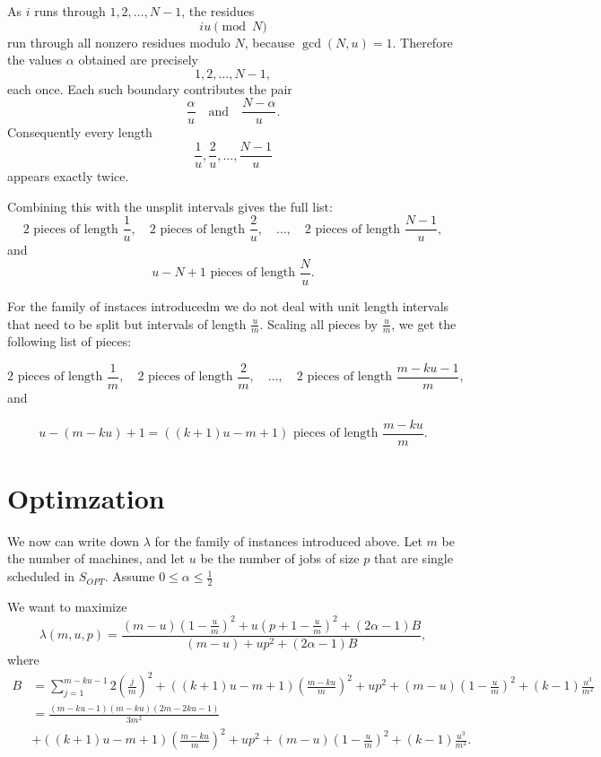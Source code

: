 \documentclass[11pt]{article}
\begin{document}
As \(i\) runs through \(1,2,\ldots,N-1\), the residues
\[
iu \pmod N
\]
run through all nonzero residues modulo \(N\), because \(\gcd(N,u)=1\). Therefore the values \(\alpha\) obtained are precisely
\[
1,2,\ldots,N-1,
\]
each once. Each such boundary contributes the pair
\[
\frac{\alpha}{u}
\quad\text{and}\quad
\frac{N-\alpha}{u}.
\]
Consequently every length
\[
\frac{1}{u},\frac{2}{u},\ldots,\frac{N-1}{u}
\]
appears exactly twice.

Combining this with the unsplit intervals gives the full list:
\[
2 \text{ pieces of length } \frac{1}{u},
\quad
2 \text{ pieces of length } \frac{2}{u},
\quad
\ldots,
\quad
2 \text{ pieces of length } \frac{N-1}{u},
\]
and
\[
u-N+1 \text{ pieces of length } \frac{N}{u}.
\]


For the family of instaces introducedm we do not deal with unit length intervals that need to be split but intervals of length $\frac{u}{m}$. 
Scaling all pieces by $\frac{u}{m}$, we get the following list of pieces:

\[
2 \text{ pieces of length } \frac{1}{m},
\quad
2 \text{ pieces of length } \frac{2}{m},
\quad
\ldots, 
\quad
2 \text{ pieces of length } \frac{m-ku-1}{m},
\]
and

\[
u-(m-ku)+1=((k+1)u-m+1) \text{ pieces of length } \frac{m-ku}{m}.
\]

\section{Optimzation}

We now can write down $\lambda$ for the family of instances introduced above. Let \(m\) be the number of machines, and let \(u\) be the number of jobs of size \(p\) that are single scheduled in \(S_{OPT}\). Assume  
$ 0 \leq \alpha \leq \frac12$


We want to maximize
\[
\lambda(m,u,p)=\frac{
(m-u)\left(1-\frac um\right)^2
 +u\left(p+1-\frac um\right)^2
 +(2\alpha-1)B
}{
(m-u)+up^2+(2\alpha-1)B
},
\]
where
\[
\begin{aligned}
B&=\sum_{j=1}^{m-ku-1}2\left(\frac{j}{m}\right)^2+\left((k+1)u-m+1\right)\left(\frac{m-ku}{m}\right)^2
+up^2
+(m-u)\left(1-\frac um\right)^2
+(k-1)\frac{u^3}{m^2}\\
&=\frac{(m-ku-1)(m-ku)(2m-2ku-1)}{3m^2}  \\
&+\left((k+1)u-m+1\right)\left(\frac{m-ku}{m}\right)^2
+up^2
+(m-u)\left(1-\frac um\right)^2
+(k-1)\frac{u^3}{m^2}.
\end{aligned}
\]
\end{document}
